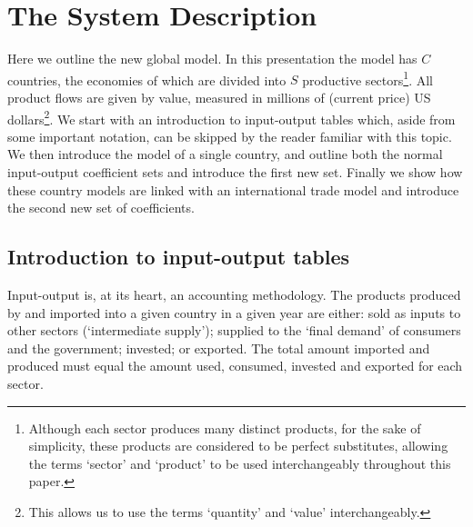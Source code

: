 \documentclass[a4paper]{article}
\begin{document}
\section{The System Description} \label{sec:system}
Here we outline the new global model.
In this presentation the model has $C$ countries, the economies of which are divided into $S$ productive sectors\footnote{Although each sector produces many distinct products, for the sake of simplicity, these products are considered to be perfect substitutes, allowing the terms `sector' and `product' to be used interchangeably throughout this paper.}.
All product flows are given by value, measured in millions of (current price) US dollars\footnote{This allows us to use the terms `quantity' and `value' interchangeably.}.
We start with an introduction to input-output tables which, aside from some important notation, can be skipped by the reader familiar with this topic.
We then introduce the model of a single country, and outline both the normal input-output coefficient sets and introduce the first new set.
Finally we show how these country models are linked with an international trade model and introduce the second new set of coefficients.

\subsection{Introduction to input-output tables} \label{sec:iots}
Input-output is, at its heart, an accounting methodology.
The products produced by and imported into a given country in a given year are either: sold as inputs to other sectors (`intermediate supply'); supplied to the `final demand' of consumers and the government; invested; or exported.
The total amount imported and produced must equal the amount used, consumed, invested and exported for each sector.
\end{document}
